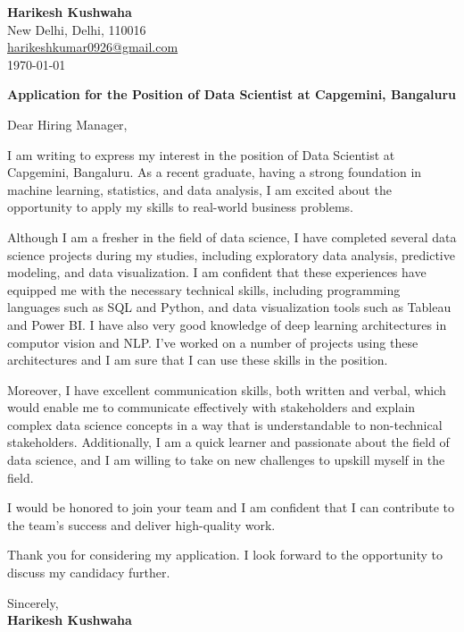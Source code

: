 \documentclass{letter}
\begin{document}
\begin{flushleft}
    \textbf{Harikesh Kushwaha}\\
    New Delhi, Delhi, 110016\\
    \href{mailto:harikeshkumar0926@gmail.com}{harikeshkumar0926@gmail.com}\\
    \today
\end{flushleft}

\begin{center}
    \textbf{Application for the Position of Data Scientist at Capgemini, Bangaluru}
\end{center}

Dear Hiring Manager,

I am writing to express my interest in the position of Data Scientist at Capgemini, Bangaluru. As a recent graduate, having a strong foundation in machine learning, statistics, and data analysis, I am excited about the opportunity to apply my skills to real-world business problems.

Although I am a fresher in the field of data science, I have completed several data science projects during my studies, including exploratory data analysis, predictive modeling, and data visualization. I am confident that these experiences have equipped me with the necessary technical skills, including programming languages such as SQL and Python, and data visualization tools such as Tableau and Power BI. I have also very good knowledge of deep learning architectures in computor vision and NLP. I've worked on a number of projects using these architectures and I am sure that I can use these skills in the position.

Moreover, I have excellent communication skills, both written and verbal, which would enable me to communicate effectively with stakeholders and explain complex data science concepts in a way that is understandable to non-technical stakeholders. Additionally, I am a quick learner and passionate about the field of data science, and I am willing to take on new challenges to upskill myself in the field.

I would be honored to join your team and I am confident that I can contribute to the team's success and deliver high-quality work.

Thank you for considering my application. I look forward to the opportunity to discuss my candidacy further.


Sincerely,\\
\textbf{Harikesh Kushwaha}
\end{document}
